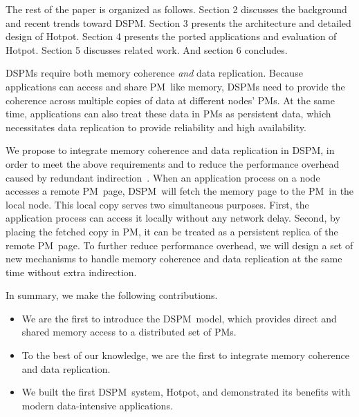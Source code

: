 \documentclass[sigconf]{acmart}
\renewcommand{\em}{\it}
\newcommand{\dsnvm}{DSPM}
\newcommand{\nvm}{PM}
\newcommand{\hotpot}{Hotpot}
\begin{document}
The rest of the paper is organized as follows. Section 2 discusses the background and recent trends toward DSPM.
Section 3 presents the architecture and detailed design of Hotpot. Section 4 presents the ported applications and
evaluation of Hotpot. Section 5 discusses related work. And section 6 concludes.

\dsnvm{}s require both memory coherence {\em and} data replication.
Because applications can access and share \nvm\ like memory, 
\dsnvm{}s need to provide the coherence across multiple copies of data at different nodes' \nvm{}s.
At the same time, applications can also treat these data in \nvm{}s as persistent data, 
which necessitates data replication to provide reliability and high availability.

We propose to integrate memory coherence and data replication in \dsnvm, 
in order to meet the above requirements and to reduce the performance overhead 
caused by redundant indirection~\cite{Nameless}.
When an application process on a node accesses a remote \nvm\ page,
\dsnvm\ will fetch the memory page to the \nvm\ in the local node. 
This local copy serves two simultaneous purposes.
First, the application process can access it locally without any network delay.
Second, by placing the fetched copy in \nvm, it can be treated as a persistent replica 
of the remote \nvm\ page.
To further reduce performance overhead, we will design a set of new mechanisms
to handle memory coherence and data replication at the same time without
extra indirection.
\fi


In summary, we make the following contributions.

 \begin{itemize} [noitemsep]
\item We are the first to introduce the \dsnvm\ model, which provides direct and shared memory access to a distributed set of \nvm{}s.

\item To the best of our knowledge, we are the first to integrate memory coherence and data replication.

\item We built the first \dsnvm\ system, \hotpot,
and demonstrated its benefits with modern data-intensive applications.

 \end{itemize} 
\fi
\end{document}
